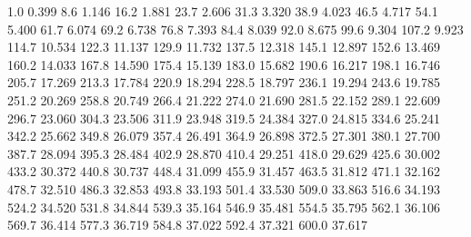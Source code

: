 1.0 0.399
8.6 1.146
16.2 1.881
23.7 2.606
31.3 3.320
38.9 4.023
46.5 4.717
54.1 5.400
61.7 6.074
69.2 6.738
76.8 7.393
84.4 8.039
92.0 8.675
99.6 9.304
107.2 9.923
114.7 10.534
122.3 11.137
129.9 11.732
137.5 12.318
145.1 12.897
152.6 13.469
160.2 14.033
167.8 14.590
175.4 15.139
183.0 15.682
190.6 16.217
198.1 16.746
205.7 17.269
213.3 17.784
220.9 18.294
228.5 18.797
236.1 19.294
243.6 19.785
251.2 20.269
258.8 20.749
266.4 21.222
274.0 21.690
281.5 22.152
289.1 22.609
296.7 23.060
304.3 23.506
311.9 23.948
319.5 24.384
327.0 24.815
334.6 25.241
342.2 25.662
349.8 26.079
357.4 26.491
364.9 26.898
372.5 27.301
380.1 27.700
387.7 28.094
395.3 28.484
402.9 28.870
410.4 29.251
418.0 29.629
425.6 30.002
433.2 30.372
440.8 30.737
448.4 31.099
455.9 31.457
463.5 31.812
471.1 32.162
478.7 32.510
486.3 32.853
493.8 33.193
501.4 33.530
509.0 33.863
516.6 34.193
524.2 34.520
531.8 34.844
539.3 35.164
546.9 35.481
554.5 35.795
562.1 36.106
569.7 36.414
577.3 36.719
584.8 37.022
592.4 37.321
600.0 37.617
